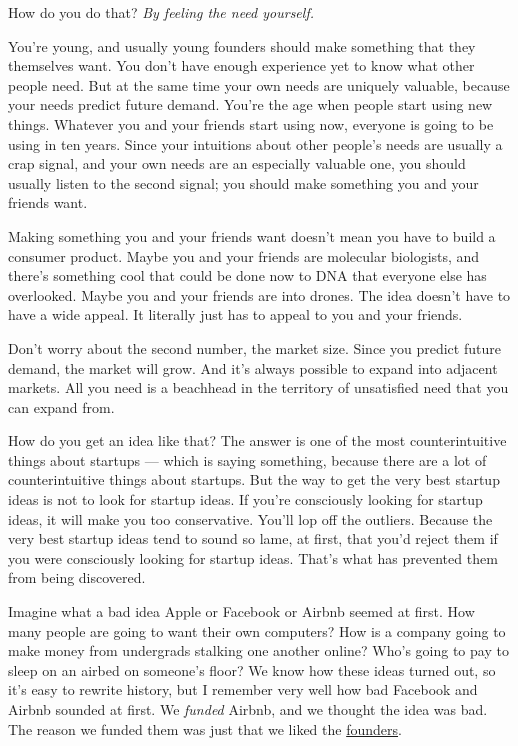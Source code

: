 \documentclass[12pt]{book}
\begin{document}
How do you do that? \emph{By feeling the need yourself.}

You're young, and usually young founders should make something that they
themselves want. You don't have enough experience yet to know what other
people need. But at the same time your own needs are uniquely valuable,
because your needs predict future demand. You're the age when people
start using new things. Whatever you and your friends start using now,
everyone is going to be using in ten years. Since your intuitions about
other people's needs are usually a crap signal, and your own needs are
an especially valuable one, you should usually listen to the second
signal; you should make something you and your friends want.

Making something you and your friends want doesn't mean you have to
build a consumer product. Maybe you and your friends are molecular
biologists, and there's something cool that could be done now to DNA
that everyone else has overlooked. Maybe you and your friends are into
drones. The idea doesn't have to have a wide appeal. It literally just
has to appeal to you and your friends.

Don't worry about the second number, the market size. Since you predict
future demand, the market will grow. And it's always possible to expand
into adjacent markets. All you need is a beachhead in the territory of
unsatisfied need that you can expand from.

How do you get an idea like that? The answer is one of the most
counterintuitive things about startups --- which is saying something,
because there are a lot of counterintuitive things about startups. But
the way to get the very best startup ideas is not to look for startup
ideas. If you're consciously looking for startup ideas, it will make you
too conservative. You'll lop off the outliers. Because the very best
startup ideas tend to sound so lame, at first, that you'd reject them if
you were consciously looking for startup ideas. That's what has
prevented them from being discovered.

Imagine what a bad idea Apple or Facebook or Airbnb seemed at first. How
many people are going to want their own computers? How is a company
going to make money from undergrads stalking one another online? Who's
going to pay to sleep on an airbed on someone's floor? We know how these
ideas turned out, so it's easy to rewrite history, but I remember very
well how bad Facebook and Airbnb sounded at first. We \emph{funded}
Airbnb, and we thought the idea was bad. The reason we funded them was
just that we liked the \href{airbnbs.html}{founders}.
\end{document}
